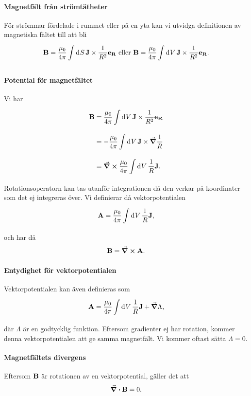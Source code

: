 \paragraph{Magnetfält från strömtätheter}
För strömmar fördelade i rummet eller på en yta kan vi utvidga definitionen av magnetiska fältet till att bli
\begin{align*}
	\vb{B} = \frac{\mu_{0}}{4\pi}\integ{}{}{S}{\vb{J}\times\frac{1}{R^{2}}\ub{R}}\ \text{eller}\ \vb{B} = \frac{\mu_{0}}{4\pi}\integ{}{}{V}{\vb{J}\times\frac{1}{R^{2}}\ub{R}}.
\end{align*}

\paragraph{Potential för magnetfältet}
Vi har
\begin{align*}
	\vb{B} &= \frac{\mu_{0}}{4\pi}\int\limits_{}^{}\dd[]{V}\vb{J}\times\frac{1}{R^{2}}\vb{e}_{\vb{R}} \\
	       &= -\frac{\mu_{0}}{4\pi}\int\limits_{}^{}\dd[]{V}\vb{J}\times\grad{\frac{1}{R}} \\
	       &= \curl{\frac{\mu_{0}}{4\pi}\int\limits_{}^{}\dd[]{V}\frac{1}{R}\vb{J}}.
\end{align*}
Rotationsoperatorn kan tas utanför integrationen då den verkar på koordinater som det ej integreras över. Vi definierar då vektorpotentialen
\begin{align*}
	\vb{A} = \frac{\mu_{0}}{4\pi}\int\limits_{}^{}\dd[]{V}\frac{1}{R}\vb{J},
\end{align*}
och har då
\begin{align*}
	\vb{B} = \curl{\vb{A}}.
\end{align*}

\paragraph{Entydighet för vektorpotentialen}
Vektorpotentialen kan även definieras som
\begin{align*}
	\vb{A} = \frac{\mu_{0}}{4\pi}\int\limits_{}^{}\dd[]{V}\frac{1}{R}\vb{J} + \grad{\Lambda},
\end{align*}
där $\Lambda$ är en godtycklig funktion. Eftersom gradienter ej har rotation, kommer denna vektorpotentialen att ge samma magnetfält. Vi kommer oftast sätta $\Lambda = 0$.

\paragraph{Magnetfältets divergens}
Eftersom $\vb{B}$ är rotationen av en vektorpotential, gäller det att
\begin{align*}
	\div{\vb{B}} = 0.
\end{align*}

